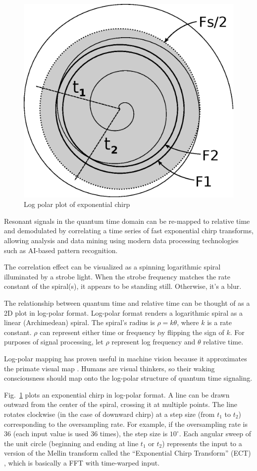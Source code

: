 \begin{figure}[h]
	\centering
	\includegraphics[width=0.7\linewidth]{../source/spiral_e}
	\caption[Quantum to Relative Time Relation]{Log polar plot of exponential chirp}
	\label{fig:spiral}
\end{figure}

Resonant signals in the quantum time domain can be re-mapped to relative time
and demodulated by correlating a time series of fast exponential chirp
transforms, allowing analysis and data mining using modern data
processing technologies such as AI-based pattern recognition.

The correlation effect can be visualized as a spinning logarithmic spiral
illuminated by a strobe light. When the strobe frequency matches the rate
constant of the spiral(s), it appears to be standing still.
Otherwise, it's a blur.

The relationship between quantum time and relative time can be thought of as a
2D plot in log-polar format.
Log-polar format renders a logarithmic spiral as a linear (Archimedean) spiral.
The spiral's radius is $\rho = k\theta$, where $k$ is a rate constant.
$\rho$ can represent either time or frequency by flipping the sign of $k$.
For purposes of signal processing, let $\rho$ represent log frequency and
$\theta$ relative time.

Log-polar mapping has proven useful in machine vision \cite{Bonmassar}
because it approximates the primate visual map \cite{Schwartz}.
Humans are visual thinkers, so their waking consciousness should map onto the
log-polar structure of quantum time signaling.

Fig.~\ref{fig:spiral} plots an exponential chirp in log-polar format.
A line can be drawn outward from the center of the spiral, crossing it at
multiple points.
The line rotates clockwise (in the case of downward chirp) at a step size
(from $t_1$ to $t_2$) corresponding to the oversampling rate.
For example, if the oversampling rate is 36 (each input value is used 36 times),
the step size is $10^{\circ}$.
Each angular sweep of the unit circle
(beginning and ending at line $t_1$ or $t_2$)
represents the input to a version of the Mellin transform called the
``Exponential Chirp Transform'' (ECT) \cite{Bonmassar}, which is
basically a FFT with time-warped input.

